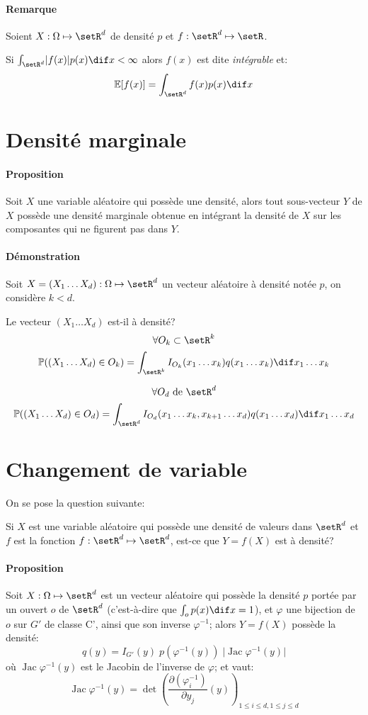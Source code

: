 \documentclass[a4paper,10pt,french,openany]{memoir}
\newcommand{\Proba}{\mathbb{P}}
\newcommand{\Esper}{\mathbb{E}}
\newcommand{\xoned}{x_1\dots x_d}
\newcommand{\Xoned}{X_1\dots X_d}
\newcommand{\xonek}{x_1\dots x_k}
\DeclareMathOperator{\jac}{Jac}
\begin{document}
\paragraph{Remarque}
Soient $X:\Omega \mapsto \setR^d$ de densité $p$ et $f:\setR^d \mapsto \setR$.

Si $\int_{\setR^d} \lvert f(x) \rvert p(x) \dif x < \infty$ alors $f(x)$ est dite \emph{intégrable} et:
\[ \Esper[f(x)] = \int_{\setR^d} f(x) p(x) \dif x \]

\section{Densité marginale}

\paragraph{Proposition}
Soit $X$ une variable aléatoire qui possède une densité, alors tout sous-vecteur $Y$ de $X$ possède une densité marginale obtenue en intégrant la densité de $X$ sur les composantes qui ne figurent pas dans $Y$.

\paragraph{Démonstration}
Soit $X=(\Xoned):\Omega \mapsto \setR^d$ un vecteur aléatoire à densité notée $p$, on considère $k<d$.

Le vecteur $(\Xoned)$ est-il à densité?
\[\forall O_k \subset \setR^k\]
\[\Proba((\Xoned) \in O_k) = \int_{\setR^k} I_{O_k}(\xonek) q(\xonek) \dif \xonek\]

\[\forall O_d \text{ de }\setR^d\]
\[\Proba((\Xoned) \in O_d) = \int_{\setR^d} I_{O_d}(x_1\dots x_k, x_{k+1}\dots x_d) q(\xoned) \dif \xoned\]

\section{Changement de variable}
On se pose la question suivante:
\begin{cquote}{}
 Si $X$ est une variable aléatoire qui possède une densité de valeurs dans $\setR^d$ et $f$ est la fonction $f:\setR^d \mapsto \setR^d$, est-ce que $Y=f(X)$ est à densité?
\end{cquote}

\paragraph{Proposition}
Soit $X:\Omega \mapsto \setR^d$ est un vecteur aléatoire qui possède la densité $p$ portée par un ouvert $o$ de $\setR^d$ (c'est-à-dire que $\int_o p(x) \dif x = 1$), et $\varphi$ une bijection de $o$ sur $G'$ de classe C', ainsi que son inverse $\varphi^{-1}$; alors $Y=f(X)$ possède la densité:
\[q(y) = I_{G'}(y)\;p(\varphi^{-1}(y)) \; \lvert \jac \varphi^{-1}(y) \rvert \]
où $\jac\varphi^{-1} (y)$ est le Jacobin de l'inverse de $\varphi$; et vaut:
\[ \jac \varphi^{-1}(y) = \det\left(\frac{\partial(\varphi^{-1}_i)}{\partial y_j}(y)\right)_{1\leq i\leq d, 1\leq j \leq d} \]
\end{document}
